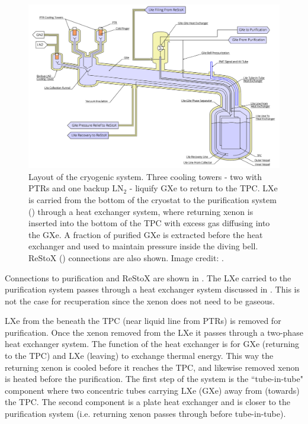 \begin{figure}
\centering
\includegraphics[width=\textwidth]{CryostatSchematic}
\caption{Layout of the cryogenic system.  Three cooling towers - two with PTRs and one backup $\mathrm{LN_2}$ - liquify GXe to return to
the TPC.  LXe is carried from the bottom of the cryostat to the purification system () through a heat
exchanger system, where
returning xenon is inserted into the bottom of the TPC with excess gas diffusing into the GXe.  A fraction of purified GXe is extracted
before the heat exchanger and used to maintain pressure inside the diving bell.  ReStoX () connections are
also shown.  Image credit: .}
\label{fig:xenon1t_cryogenics_schematic}
\end{figure}

Connections to purification and ReStoX are shown in .  The LXe carried to the purification system
passes through a heat exchanger system discussed in .  This is not the case for recuperation since the xenon
does not need to be gaseous.

LXe from the beneath the TPC (near liquid line from PTRs) is removed for purification.  Once the xenon removed from the LXe it passes
through a two-phase heat exchanger system.  The function of the heat exchanger is for GXe (returning to the TPC) and LXe (leaving) to
exchange thermal energy.  This way the returning xenon is cooled before it reaches the TPC, and likewise removed xenon is heated before
the purification.  The first step of the system is the ``tube-in-tube" component where two concentric tubes carrying LXe (GXe) away from
(towards)
the TPC.  The second component is a plate heat exchanger and is closer to the purification system (i.e. returning xenon passes through
before tube-in-tube).

